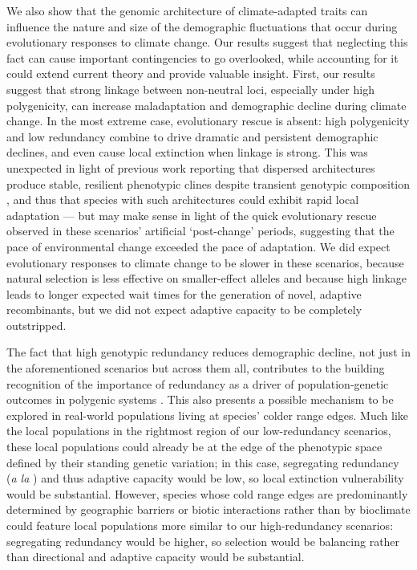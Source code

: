 \documentclass[9pt,twocolumn,twoside,lineno]{pnas-new}
\begin{document}
We also show that the genomic architecture of climate-adapted traits
can influence the nature and size of the demographic fluctuations
that occur during evolutionary responses to climate change.
Our results suggest that neglecting this fact
can cause important contingencies to go overlooked,
while accounting for it could extend current theory and provide valuable insight.
First, our results suggest that strong linkage between non-neutral loci,
especially under high polygenicity, can increase maladaptation and demographic decline
during climate change. 
In the most extreme case, evolutionary rescue is absent:
high polygenicity and low redundancy
combine to drive dramatic and persistent demographic declines,
and even cause local extinction when linkage is strong.
This was unexpected in light of previous work reporting
that dispersed architectures produce stable,
resilient phenotypic clines despite transient genotypic composition \cite{yeaman_amnat,yeaman_review},
and thus that species with such architectures
could exhibit rapid local adaptation \cite{aitken_yeaman}
--- but may make sense in light of the quick evolutionary
rescue observed in these scenarios' artificial 
`post-change' periods, suggesting that the pace of environmental change exceeded the pace of
adaptation. 
We did expect evolutionary responses to climate change
to be slower in these scenarios,
because natural selection is less effective on smaller-effect alleles
and because high linkage leads to longer expected wait times for the generation
of novel, adaptive recombinants, but we did not expect
adaptive capacity to be completely outstripped.

The fact that high genotypic redundancy reduces demographic decline,
not just in the aforementioned scenarios but across them all, contributes to the building recognition of the importance of redundancy
as a driver of population-genetic outcomes in polygenic systems
\cite{laruson,yeaman_review}.
This also presents a possible mechanism to be explored
in real-world populations living at species' colder range edges.
Much like the local populations in the rightmost region of our low-redundancy scenarios,
these local populations could already be at the edge of the phenotypic space defined by
their standing genetic variation;
in this case, 
segregating redundancy (\textit{a la} \cite{laruson}) and thus
adaptive capacity would be low,
so local extinction vulnerability would be substantial.
However, species whose cold range edges are predominantly determined by geographic barriers
or biotic interactions rather than by bioclimate \cite{thomas}
could feature local populations more similar to our high-redundancy scenarios:
segregating redundancy would be higher,
so selection would be balancing rather than directional and adaptive capacity would be substantial.
\end{document}
